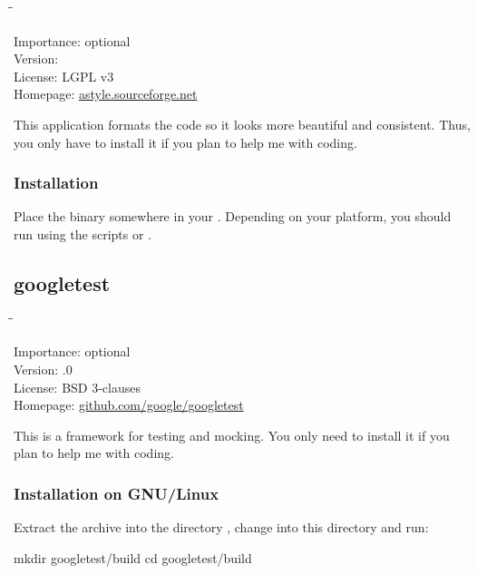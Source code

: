 \begin{tabbing}
  \hspace*{6em}\=\=\kill

  Importance:  \> optional \\
  Version:      \\
  License:     \> LGPL v3 \\
  Homepage:    \> \href{http://astyle.sourceforge.net/}{astyle.sourceforge.net}
\end{tabbing}

This application formats the code so it looks more beautiful and
consistent.  Thus, you only have to install it if you plan to help me
with coding.

\subsubsection{Installation}

Place the binary somewhere in your .  Depending on your
platform, you should run  using the scripts
 or .

\subsection{googletest}

\begin{tabbing}
  \hspace*{6em}\=\=\kill

  Importance:  \> optional \\
  Version:     .0 \\
  License:     \> BSD 3-clauses \\
  Homepage:    \> \href{https://github.com/google/googletest}{github.com/google/googletest}
\end{tabbing}

This is a framework for testing and mocking.  You only need to install
it if you plan to help me with coding.

\subsubsection{Installation on GNU/Linux}

Extract the archive into the directory ,
change into this directory and run:

\begin{VerbatimBoth}
  mkdir googletest/build
  cd googletest/build
\end{VerbatimBoth}

